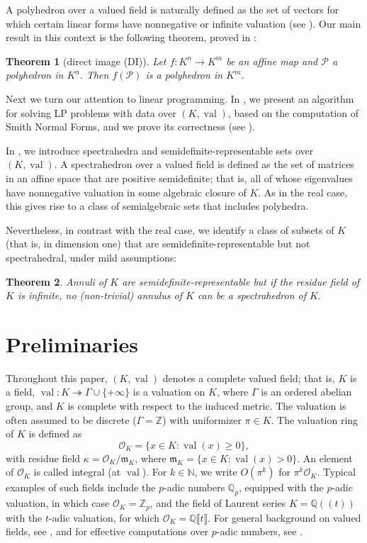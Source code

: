 \documentclass{elsarticle}
\theoremstyle{plain}
\newtheorem{theorem}{Theorem}[section]
\theoremstyle{definition}
\newcommand{\N}{\mathbb{N}} %
\newcommand{\PP}{\mathcal{P}}
\DeclareMathOperator{\val}{val}
\def\QQ{\ensuremath{\mathbb{Q}}}
\def\ZZ{\ensuremath{\mathbb{Z}}}
\newcommand{\OK}{\mathcal{O}_K}
\begin{document}
A polyhedron over a valued field is naturally defined as the set of vectors for which certain
linear forms have nonnegative or infinite valuation (see ). Our main result in this
context is the following theorem, proved in :

\begin{theorem}[direct image (DI)] \label{theo:DI}
Let $f : K^n \to K^m$ be an affine map and $\PP$ a polyhedron in $K^n.$
Then $f(\PP)$ is a polyhedron in $K^m$.
\end{theorem}

Next we turn our attention to linear programming. In , we present
an algorithm for solving LP problems with data over $(K,\val)$, based on the computation of 
Smith Normal Forms, and we prove its correctness (see ).

In , we introduce spectrahedra and semidefinite-re\-pre\-sen\-ta\-ble sets
over $(K,\val)$. A spectrahedron over a valued field is defined as the set of matrices
in an affine space that are positive semidefinite; that is, all of whose eigenvalues
have nonnegative valuation in some algebraic closure of $K$. As in the real case, this gives rise
to a class of semialgebraic sets that includes polyhedra.

Nevertheless, in contrast with the real case, we identify a class of subsets of $K$
(that is, in dimension one) that are semidefinite-representable but not spectrahedral, 
under mild assumptions:

\begin{theorem}\label{main_2}
Annuli of $K$ are semidefinite-representable but if the residue field of $K$ is infinite, no (non-trivial) annulus of $K$ can be a spectrahedron of $K.$
\end{theorem}


\section{Preliminaries}
\label{sec:prelim}

Throughout this paper, $(K,\val)$ denotes a complete valued field; that is, $K$ is a field,
$\val : K \twoheadrightarrow \Gamma \cup \{+\infty\}$ is a valuation on $K$, where $\Gamma$ 
is an ordered abelian group, and $K$ is complete with respect to the induced metric.
The valuation is often assumed to be discrete ($\Gamma=\ZZ$)
with uniformizer $\pi \in K$. The valuation ring of $K$ is defined as
$$
\OK = \{x \in K : \val(x) \geq 0\},
$$
with residue field $\kappa = \OK/\mathfrak{m}_K$, where
$\mathfrak{m}_K = \{x \in K : \val(x) > 0\}$.
An element of $\OK$ is called integral (at $\val$).
For $k \in \N$, we write $O(\pi^k)$ for $\pi^k \OK$.
Typical examples of such fields include the $p$-adic numbers 
$\QQ_p$, equipped with the $p$-adic valuation, in which case $\OK = \ZZ_p$, 
and the field of Laurent series
$K=\QQ(\!(t)\!)$ with the $t$-adic valuation,
for which $\OK = \QQ \llbracket t \rrbracket$.
For general background on valued fields, see \cite{Serre:1979,engler2005valued},
and for effective computations over $p$-adic numbers, see \cite{caruso_computations_2017}.
\end{document}
